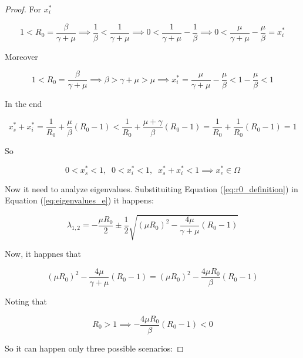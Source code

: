 \begin{proof}
For $x_i^*$

\begin{equation}
    1 < R_0 = \frac{\beta}{\gamma + \mu} \implies \frac{1}{\beta} < \frac{1}{\gamma + \mu} \implies 0 < \frac{1}{\gamma + \mu} - \frac{1}{\beta} \implies 0 < \frac{\mu}{\gamma + \mu} - \frac{\mu}{\beta} = x_i^*
\end{equation}

Moreover

\begin{equation}
    1 < R_0 = \frac{\beta}{\gamma + \mu} \implies \beta > \gamma + \mu > \mu \implies x_i^* = \frac{\mu}{\gamma + \mu} - \frac{\mu}{\beta} < 1 - \frac{\mu}{\beta} < 1
\end{equation}

In the end

\begin{equation}
    x_s^* + x_i^* = \frac{1}{R_0} + \frac{\mu}{\beta}\left(R_0 - 1\right) < \frac{1}{R_0} + \frac{\mu+\gamma}{\beta}\left(R_0 - 1\right) =  \frac{1}{R_0} + \frac{1}{R_0}\left(R_0 - 1\right) = 1
\end{equation}

So

\begin{equation}
    0 < x_s^* < 1, \;\; 0 < x_i^* < 1, \;\; x_s^* + x_i^* < 1 \implies x_e^* \in \Omega 
\end{equation}

Now it need to analyze eigenvalues. Substituiting Equation (\ref{eq:r0_definition}) in Equation (\ref{eq:eigenvalues_e}) it happens:

\begin{equation}
    \lambda_{1,2} = -\frac{\mu R_0}{2} \pm \frac{1}{2}\sqrt{\left(\mu R_0\right)^2-\frac{4\mu}{\gamma + \mu}(R_0 - 1)}
\end{equation}

Now, it happnes that

\begin{equation}
    \left(\mu R_0\right)^2-\frac{4\mu}{\gamma + \mu}(R_0 - 1) = \left(\mu R_0\right)^2-\frac{4\mu R_0}{\beta}(R_0 - 1)
\end{equation}

Noting that

\begin{equation}
    R_0 > 1 \implies -\frac{4\mu R_0}{\beta}(R_0 - 1) < 0
\end{equation}

So it can happen only three possible scenarios:


\end{proof}
